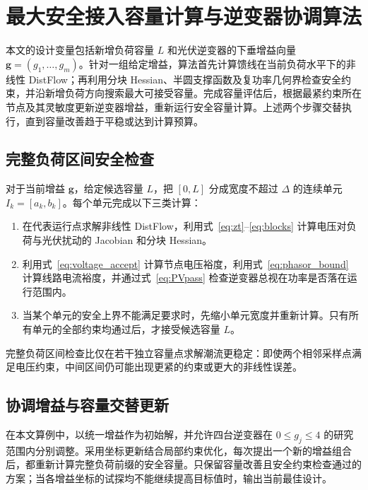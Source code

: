 \section{最大安全接入容量计算与逆变器协调算法}\label{sec:algorithm}

本文的设计变量包括新增负荷容量 $L$ 和光伏逆变器的下垂增益向量 $\bm g=(g_1,\ldots,g_m)$。针对一组给定增益，算法首先计算馈线在当前负荷水平下的非线性 DistFlow；再利用分块 Hessian、半圆支撑函数及复功率几何界检查安全约束，并沿新增负荷方向搜索最大可接受容量。完成容量评估后，根据最紧约束所在节点及其灵敏度更新逆变器增益，重新运行安全容量计算。上述两个步骤交替执行，直到容量改善趋于平稳或达到计算预算。



\subsection{完整负荷区间安全检查}
对于当前增益 $\bm g$，给定候选容量 $L$，把 $[0,L]$ 分成宽度不超过 $\Delta$ 的连续单元 $I_k=[a_k,b_k]$。每个单元完成以下三类计算：
\begin{enumerate}[leftmargin=8mm,itemsep=2pt]
\item 在代表运行点求解非线性 DistFlow，利用式~\eqref{eq:zt}--\eqref{eq:blocks} 计算电压对负荷与光伏扰动的 Jacobian 和分块 Hessian。
\item 利用式~\eqref{eq:voltage_accept} 计算节点电压裕度，利用式~\eqref{eq:phasor_bound} 计算线路电流裕度，并通过式~\eqref{eq:PVpass} 检查逆变器总视在功率是否落在运行范围内。
\item 当某个单元的安全上界不能满足要求时，先缩小单元宽度并重新计算。只有所有单元的全部约束均通过后，才接受候选容量 $L$。
\end{enumerate}
完整负荷区间检查比仅在若干独立容量点求解潮流更稳定：即使两个相邻采样点满足电压约束，中间区间仍可能出现更紧的约束或更大的非线性误差。

\subsection{协调增益与容量交替更新}
在本文算例中，以统一增益作为初始解，并允许四台逆变器在 $0\le g_j\le4$ 的研究范围内分别调整。采用坐标更新结合局部约束优化，每次提出一个新的增益组合后，都重新计算完整负荷前缀的安全容量。只保留容量改善且安全约束检查通过的方案；当各增益坐标的试探均不能继续提高目标值时，输出当前最佳设计。

